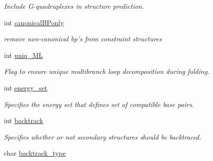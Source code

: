 \begin{DoxyCompactItemize}
\begin{DoxyCompactList}\small\item\em Include G-\/quadruplexes in structure prediction. \end{DoxyCompactList}\item 
\hypertarget{group__model__details_a87edce006e9daff84363ec0e6abd2182}{int \hyperlink{group__model__details_a87edce006e9daff84363ec0e6abd2182}{canonical\-B\-Ponly}}\label{group__model__details_a87edce006e9daff84363ec0e6abd2182}

\begin{DoxyCompactList}\small\item\em remove non-\/canonical bp's from constraint structures \end{DoxyCompactList}\item 
\hypertarget{group__model__details_ade065b814a4e2e72ead93ab502613ed2}{int \hyperlink{group__model__details_ade065b814a4e2e72ead93ab502613ed2}{uniq\-\_\-\-M\-L}}\label{group__model__details_ade065b814a4e2e72ead93ab502613ed2}

\begin{DoxyCompactList}\small\item\em Flag to ensure unique multibranch loop decomposition during folding. \end{DoxyCompactList}\item 
\hypertarget{group__model__details_a5eee4e3b468eb690d1407e0178dafb3f}{int \hyperlink{group__model__details_a5eee4e3b468eb690d1407e0178dafb3f}{energy\-\_\-set}}\label{group__model__details_a5eee4e3b468eb690d1407e0178dafb3f}

\begin{DoxyCompactList}\small\item\em Specifies the energy set that defines set of compatible base pairs. \end{DoxyCompactList}\item 
\hypertarget{group__model__details_a31f4471608cbdd03887f63c281823adb}{int \hyperlink{group__model__details_a31f4471608cbdd03887f63c281823adb}{backtrack}}\label{group__model__details_a31f4471608cbdd03887f63c281823adb}

\begin{DoxyCompactList}\small\item\em Specifies whether or not secondary structures should be backtraced. \end{DoxyCompactList}\item 
\hypertarget{group__model__details_abb265da25121d22ed11c8435861f0e53}{char \hyperlink{group__model__details_abb265da25121d22ed11c8435861f0e53}{backtrack\-\_\-type}}\label{group__model__details_abb265da25121d22ed11c8435861f0e53}


\end{DoxyCompactItemize}
